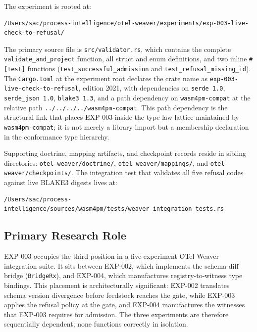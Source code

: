 The experiment is rooted at:
\begin{verbatim}
/Users/sac/process-intelligence/otel-weaver/experiments/exp-003-live-check-to-refusal/
\end{verbatim}

The primary source file is \texttt{src/validator.rs}, which contains the complete
\texttt{validate\_and\_project} function, all struct and enum definitions, and two
inline \texttt{\#[test]} functions (\texttt{test\_successful\_admission} and
\texttt{test\_refusal\_missing\_id}). The \texttt{Cargo.toml} at the experiment root
declares the crate name as \texttt{exp-003-live-check-to-refusal}, edition 2021, with
dependencies on \texttt{serde 1.0}, \texttt{serde\_json 1.0}, \texttt{blake3 1.3},
and a path dependency on \texttt{wasm4pm-compat} at the relative path
\texttt{../../../../wasm4pm-compat}. This path dependency is the structural link that
places EXP-003 inside the type-law lattice maintained by \texttt{wasm4pm-compat};
it is not merely a library import but a membership declaration in the conformance
type hierarchy.

Supporting doctrine, mapping artifacts, and checkpoint records reside in sibling
directories: \texttt{otel-weaver/doctrine/}, \texttt{otel-weaver/mappings/}, and
\texttt{otel-weaver/checkpoints/}. The integration test that validates all five
refusal codes against live BLAKE3 digests lives at:
\begin{verbatim}
/Users/sac/process-intelligence/sources/wasm4pm/tests/weaver_integration_tests.rs
\end{verbatim}

\subsection{Primary Research Role}
\label{sec:otel-weaver-exp-003-live-check-to-refusal-identity-role}

EXP-003 occupies the third position in a five-experiment OTel Weaver integration
suite. It sits between EXP-002, which implements the schema-diff bridge
(\texttt{BridgeRx}), and EXP-004, which manufactures registry-to-witness type
bindings. This placement is architecturally significant: EXP-002 translates schema
version divergence before feedstock reaches the gate, while EXP-003 applies the
refusal policy at the gate, and EXP-004 manufactures the witnesses that EXP-003
requires for admission. The three experiments are therefore sequentially dependent;
none functions correctly in isolation.

